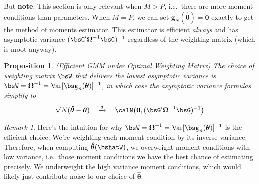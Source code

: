 \documentclass[12pt]{article}
\theoremstyle{plain}
\newtheorem{prop}[thm]{Proposition}
\theoremstyle{definition}
\theoremstyle{remark}
\newtheorem*{rmk}{Remark}
\newcommand{\bstheta}{\boldsymbol{\theta}}
\newcommand{\bsOmega}{\boldsymbol{\Omega}}
\newcommand{\bshattheta}{\boldsymbol{\hat{\theta}}}
\newcommand{\bsbarg}{\boldsymbol{\overline{g}}}
\renewcommand{\bso}{\boldsymbol{0}}
\newcommand{\Var}{\operatorname{Var}}
\newcommand{\dto}{\xrightarrow{d}}
\begin{document}
But \textbf{note}: This section is only relevant when $M>P$, i.e.\ there
are more moment conditions than parameters. When $M=P$, we can set
$\bsbarg_N(\bshattheta)=\bso$ exactly to get the method of moments
estimator. This estimator is efficient \emph{always} and has
asymptotic variance $(\bsG'\bsOmega^{-1}\bsG)^{-1}$ regardless of
the weighting matrix (which is moot anyway).

\begin{prop}\emph{(Efficient GMM under Optimal Weighting Matrix)}
The choice of weighting matrix $\bsW$ that delivers the lowest asymptotic
variance is $\bsW=\bsOmega^{-1}=\Var[\bsg_n(\bstheta)]^{-1}$, in which
case the asymptotic variance formulas simplify to
\begin{align*}
  \sqrt{N}(\bshattheta-\bstheta)
  \quad\dto\quad
  \calN\big(\bso,(\bsG'\bsOmega^{-1}\bsG)^{-1}\big)
\end{align*}
\end{prop}

\begin{rmk}
Here's the intuition for why
$\bsW=\bsOmega^{-1}=\Var[\bsg_n(\bstheta)]^{-1}$ is the efficient
choice:
We're weighting each moment condition by its inverse variance.
Therefore, when computing $\bshattheta(\bshatW)$, we overweight moment
conditions with low variance, i.e.\ those moment conditions we have the
best chance of estimating precisely.  We underweight the high variance
moment conditions, which would likely just contribute noise to our
choice of $\bshattheta$.
\end{rmk}
\end{document}

